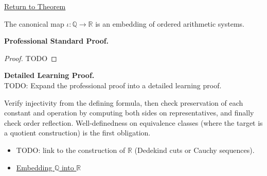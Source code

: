 \newpage
{}
\label{prf:q-embeds-in-r}

\begin{remark*}[Return]
\hyperref[thm:q-embeds-in-r]{Return to Theorem}
\end{remark*}

\begin{theorem*}
The canonical map $\iota:\mathbb{Q}\to \mathbb{R}$ is an embedding of ordered arithmetic systems.
\end{theorem*}

\textbf{Professional Standard Proof.}~\\
\begin{proof}
TODO
\end{proof}

\textbf{Detailed Learning Proof.}~\\
TODO: Expand the professional proof into a detailed learning proof.

\begin{remark*}
Verify injectivity from the defining formula, then check preservation of each constant and operation by computing both sides on representatives, and finally check order reflection. Well-definedness on equivalence classes (where the target is a quotient construction) is the first obligation.
\end{remark*}

\begin{dependencies}
\begin{itemize}
  \item TODO: link to the construction of $\mathbb{R}$ (Dedekind cuts or Cauchy sequences).
  \item \hyperref[def:embedding-q-into-r]{Embedding $\mathbb{Q}$ into $\mathbb{R}$}
\end{itemize}
\end{dependencies}
